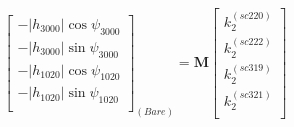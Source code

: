 \begin{equation}
    \begin{bmatrix}
        -|h_{3000}| \cos \psi_{3000} \\
        -|h_{3000}| \sin \psi_{3000} \\
        -|h_{1020}| \cos \psi_{1020} \\
        -|h_{1020}| \sin \psi_{1020} \\
        \end{bmatrix}_{(Bare)}
         =
        \boldsymbol{M}
        \begin{bmatrix}
        k_2^{(sc220)} \\
        k_2^{(sc222)}\\
        k_2^{(sc319)} \\
        k_2^{(sc321)}\\
        \end{bmatrix}        
\end{equation}
